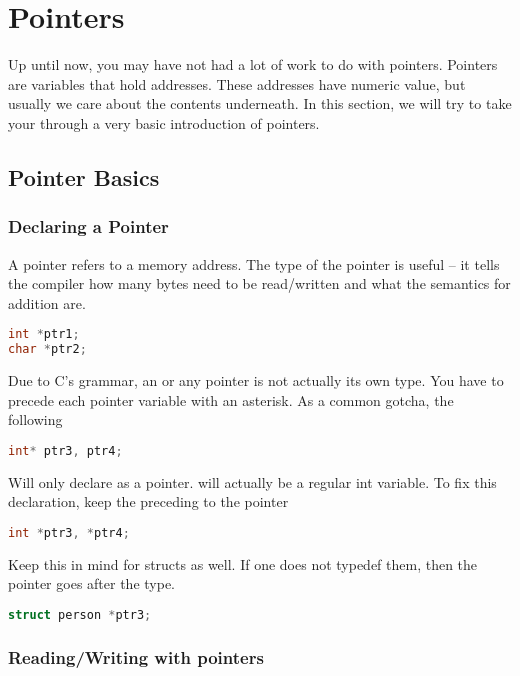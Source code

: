\section{Pointers}

Up until now, you may have not had a lot of work to do with pointers. Pointers are variables that hold addresses.
These addresses have numeric value, but usually we care about the contents underneath.
In this section, we will try to take your through a very basic introduction of pointers.

\subsection{Pointer Basics}

\subsubsection{Declaring a Pointer}

A pointer refers to a memory address. The type of the pointer is useful -- it tells the compiler how many bytes need to be read/written and what the semantics for addition are.

\begin{lstlisting}[language=C]
int *ptr1;
char *ptr2;
\end{lstlisting}

Due to C's grammar, an  or any pointer is not actually its own type. You have to precede each pointer variable with an asterisk. As a common gotcha, the following

\begin{lstlisting}[language=C]
int* ptr3, ptr4;
\end{lstlisting}

Will only declare  as a pointer.
 will actually be a regular int variable.
To fix this declaration, keep the \keyword{*} preceding to the pointer

\begin{lstlisting}[language=C]
int *ptr3, *ptr4;
\end{lstlisting}

Keep this in mind for structs as well.
If one does not typedef them, then the pointer goes after the type.

\begin{lstlisting}[language=C]
struct person *ptr3;
\end{lstlisting}

\subsubsection{Reading/Writing with pointers}

